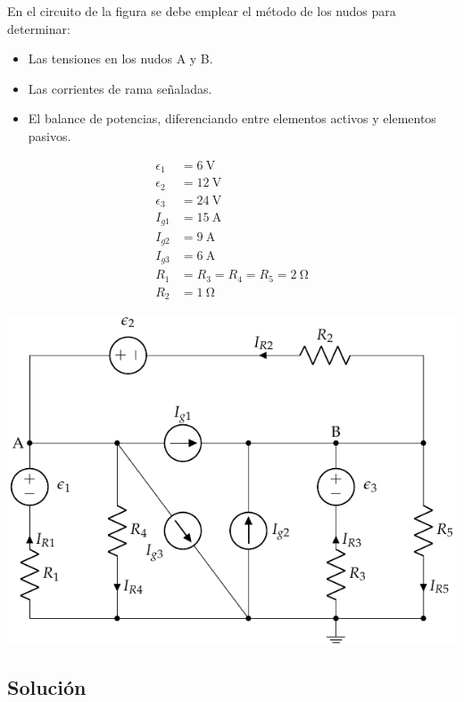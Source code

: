 \documentclass[10pt]{article}
\begin{document}
En el circuito de la figura se debe emplear el método de los nudos para determinar:
\begin{itemize}
\item Las tensiones en los nudos A y B.
\item Las corrientes de rama señaladas.
\item El balance de potencias, diferenciando entre elementos activos y elementos pasivos.
\end{itemize}

\begin{minipage}[c]{0.3\linewidth}
  \begin{align*}
    \epsilon_1&=\SI{6}{\volt}\\
    \epsilon_2&=\SI{12}{\volt}\\
    \epsilon_3&=\SI{24}{\volt}\\
    I_{g1} &= \SI{15}{\ampere}\\
    I_{g2} &= \SI{9}{\ampere}\\
    I_{g3} &= \SI{6}{\ampere}\\
    R_{1}&= R_3 = R_4 = R_5 = \SI{2}{\ohm}\\
    R_{2}&= \SI{1}{\ohm}
  \end{align*}
\end{minipage}
\begin{minipage}[c]{0.7\linewidth}
  \includegraphics{figs/nudos_fuentes.pdf}
\end{minipage}

\subsection*{Solución}
\end{document}
